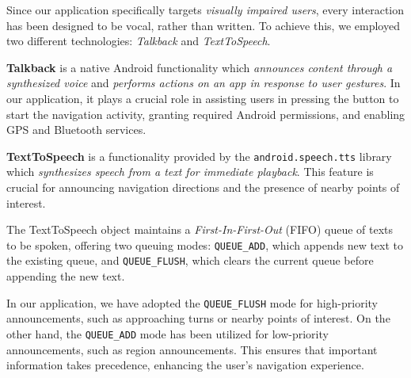 Since our application specifically targets \textit{visually impaired users}, every interaction has been designed to be vocal, rather than written. 
To achieve this, we employed two different technologies: \textit{Talkback} and \textit{TextToSpeech}.


\textbf{Talkback} is a native Android functionality which \textit{announces content through a synthesized voice} and \textit{performs actions on an app in response to user gestures}\cite{android:accessibility}. 
In our application, it plays a crucial role in assisting users in pressing the button to start the navigation activity, granting required Android permissions, and enabling GPS and Bluetooth services.\cite{android:request-runtime-permissions, android:bluetooth-setup}


\textbf{TextToSpeech} is a functionality provided by the \texttt{android.speech.tts} library which \textit{synthesizes speech from a text for immediate playback}.\cite{android:text-to-speech-ref}
This feature is crucial for announcing navigation directions and the presence of nearby points of interest. 

The TextToSpeech object maintains a \textit{First-In-First-Out} (FIFO) queue of texts to be spoken, offering two queuing modes: \texttt{QUEUE\_ADD}, which appends new text to the existing queue, and \texttt{QUEUE\_FLUSH}, which clears the current queue before appending the new text.

In our application, we have adopted the \texttt{QUEUE\_FLUSH} mode for high-priority announcements, such as approaching turns or nearby points of interest. On the other hand, the \texttt{QUEUE\_ADD} mode has been utilized for low-priority announcements, such as region announcements. 
This ensures that important information takes precedence, enhancing the user's navigation experience.
